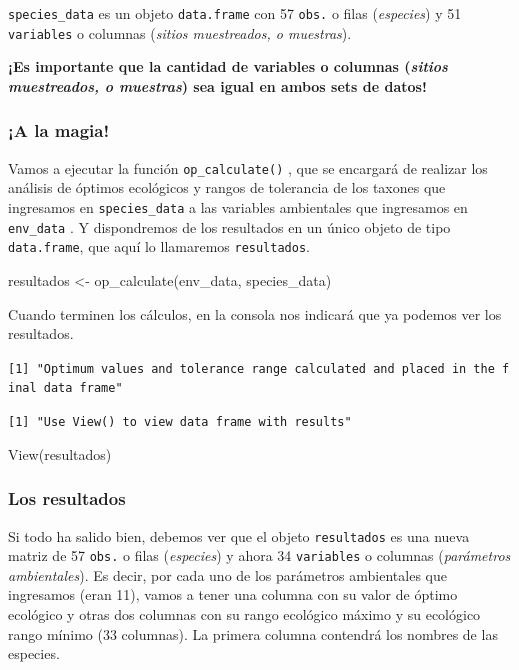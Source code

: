 \documentclass[
]{book}
\newenvironment{Shaded}{\begin{snugshade}}{\end{snugshade}}
\newcommand{\FunctionTok}[1]{\textcolor[rgb]{0.00,0.00,0.00}{#1}}
\newcommand{\NormalTok}[1]{#1}
\newcommand{\OtherTok}[1]{\textcolor[rgb]{0.56,0.35,0.01}{#1}}
\begin{document}
\texttt{species\_data} es un objeto \texttt{data.frame} con 57 \texttt{obs.} o filas (\emph{especies}) y 51 \texttt{variables} o columnas (\emph{sitios muestreados, o muestras}).

\textbf{¡Es importante que la cantidad de variables o columnas (\emph{sitios muestreados, o muestras}) sea igual en ambos sets de datos!}

\hypertarget{a-la-magia-1}{%
\subsubsection{\texorpdfstring{\textbf{¡A la magia!}}{¡A la magia!}}\label{a-la-magia-1}}

Vamos a ejecutar la función \texttt{op\_calculate()} , que se encargará de realizar los análisis de óptimos ecológicos y rangos de tolerancia de los taxones que ingresamos en \texttt{species\_data} a las variables ambientales que ingresamos en \texttt{env\_data} . Y dispondremos de los resultados en un único objeto de tipo \texttt{data.frame}, que aquí lo llamaremos \texttt{resultados}.

\begin{Shaded}
\begin{Highlighting}[]
\NormalTok{resultados }\OtherTok{\textless{}{-}} \FunctionTok{op\_calculate}\NormalTok{(env\_data, species\_data)}
\end{Highlighting}
\end{Shaded}

Cuando terminen los cálculos, en la consola nos indicará que ya podemos ver los resultados.

\texttt{{[}1{]}\ "Optimum\ values\ and\ tolerance\ range\ calculated\ and\ placed\ in\ the\ final\ data\ frame"}

\texttt{{[}1{]}\ "Use\ View()\ to\ view\ data\ frame\ with\ results"}

\begin{Shaded}
\begin{Highlighting}[]
\FunctionTok{View}\NormalTok{(resultados)}
\end{Highlighting}
\end{Shaded}

\hypertarget{los-resultados-1}{%
\subsubsection{Los resultados}\label{los-resultados-1}}

Si todo ha salido bien, debemos ver que el objeto \texttt{resultados} es una nueva matriz de 57 \texttt{obs.} o filas (\emph{especies}) y ahora 34 \texttt{variables} o columnas (\emph{parámetros ambientales}). Es decir, por cada uno de los parámetros ambientales que ingresamos (eran 11), vamos a tener una columna con su valor de óptimo ecológico y otras dos columnas con su rango ecológico máximo y su ecológico rango mínimo (33 columnas). La primera columna contendrá los nombres de las especies.
\end{document}
